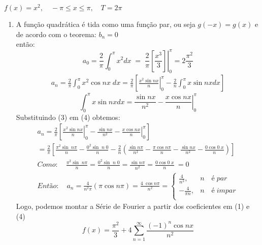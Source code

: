 \documentclass[12pt]{article}
\newcommand*\Eval[3]{\left.#1\right\rvert_{#2}^{#3}}
\begin{document}
\section{}
$f(x) = x^{2},\quad -\pi \le x \le \pi,\quad T = 2\pi$
\begin{enumerate}[label=S.]
    \item 
   A função quadrática é tida como uma função par, ou seja $g(-x) = g(x)$ e de acordo com o teorema:
   $
   b_{n} = 0
   $\\
   então:
   \begin{equation}
   a_{0} = \frac{2}{\pi} \int _{0}^{\pi} x^{2} dx \; = \; \frac{2}{\pi} \Eval{\left[\frac{x^{3}}{3} \right]}{0}{\pi} = 2 \frac{\pi^{2}}{3}
   \end{equation}
   \begin{equation}
   \begin{split}
   a_{n} = \frac{2}{\pi} \int _{0}^{\pi} x^{2} \cos nx \;dx = \frac{2}{\pi} \left[ \Eval{\frac{x^{2} \sin nx}{n}}{0}{\pi} - \frac{2}{n}\int_{0}^{\pi} x \sin nx dx\right]
   \end{split}
   \end{equation}
   \begin{equation}
   \int_{0}^{\pi} x \sin nx dx = \Eval{\frac{\sin nx}{n^{2}} - \frac{x \cos nx}{n}}{0}{\pi}
   \end{equation}
   Substituindo (3) em (4) obtemos:
   \begin{equation}
   \begin{split}
   a_{n} = \frac{2}{\pi} \left[ \Eval{\frac{x^{2} \sin nx}{n}}{0}{\pi} -\Eval{\frac{\sin nx}{n^{2}} - \frac{x \cos nx}{n}}{0}{\pi}\right] \\
   = \frac{2}{\pi} \left[\frac{\pi^{2}\sin\; n\pi}{n} - \frac{0^{2}\sin \; n\;0}{n} -  \frac{2}{n}\left(\frac{\sin n\pi}{n^{2}} - \frac{\pi\cos n\pi}{n} - \frac{\sin nx}{n^{2}} - \frac{0 \cos 0\;x}{n}\right)\right]\\
   Como:\quad \frac{\pi^{2}\sin\; n\pi}{n} = \frac{0^{2}\sin \; n\;0}{n} = \frac{\sin n\pi}{n^{2}} = \frac{0 \cos 0\;x}{n}\ = 0 \\Então: \quad a_{n} = \frac{4}{n^{2}\pi} \left(\pi \cos n\pi \right) = \frac{4\;\cos n\pi }{n^{2}} =
   \begin{cases}
    \frac{4}{n^{2}} , & n \quad é\;  par\\
    -\frac{4}{\pi n} , & n \quad é\;  impar\\
    \end{cases}
   \end{split}
   \end{equation}
   Logo, podemos montar a Série de Fourier a partir dos coeficientes em (1) e (4)
   \begin{equation}
   f(x) = \frac{\pi^{2}}{3} + 4 \sum_{n=1}^{\infty} \frac{(-1)^{n}\cos n x}{n^{2}} 
   \end{equation}
   \end{enumerate}
\end{document}
